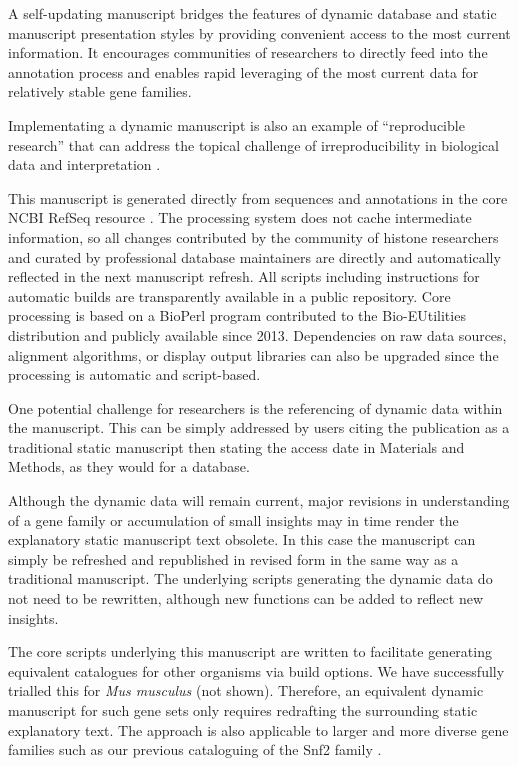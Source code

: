   A self-updating manuscript bridges the features of dynamic database and static manuscript
  presentation styles by providing convenient access to the most current information.
  It encourages communities of researchers to directly feed into the annotation process
  and enables rapid leveraging of the most current data for relatively stable gene families.

  Implementating a dynamic manuscript is also an example of ``reproducible research''
  \citep{reproducible-research-bioinformatics,reproducible-research-law}
  that can address the topical challenge of irreproducibility in biological data
  and interpretation \citep{ErrorProne2012,OpenPrograms2012}.

  This manuscript is generated directly from sequences and annotations
  in the core NCBI RefSeq resource \citep{OLearyRefseq2016}.
  The processing system does not cache intermediate information,
  so all changes contributed by the community of histone researchers
  and curated by professional database maintainers
  are directly and automatically reflected in the next manuscript refresh.
  All scripts including instructions for automatic builds
  are transparently available in a public repository.
  Core processing is based on a BioPerl program contributed to the Bio-EUtilities distribution
  and publicly available since 2013.
  Dependencies on raw data sources, alignment algorithms, or display output libraries
  can also be upgraded since the processing is automatic and script-based.

  One potential challenge for researchers is the referencing of dynamic data within the manuscript.
  This can be simply addressed by users citing the publication as a traditional static manuscript
  then stating the access date in Materials and Methods, as they would for a database.

  Although the dynamic data will remain current,
  major revisions in understanding of a gene family or accumulation of small insights
  may in time render the explanatory static manuscript text obsolete.
  In this case the manuscript can simply be refreshed and republished in revised form
  in the same way as a traditional manuscript.
  The underlying scripts generating the dynamic data do not need to be rewritten,
  although new functions can be added to reflect new insights.

  The core scripts underlying this manuscript are written to facilitate generating
  equivalent catalogues for other organisms via build options.
  We have successfully trialled this for \textit{Mus musculus} (not shown).
  Therefore, an equivalent dynamic manuscript for such gene sets
  only requires redrafting the surrounding static explanatory text.
  The approach is also applicable to larger and more diverse gene families such as
  our previous cataloguing of the Snf2 family \citep{andrew-snf2-catalogue}.
